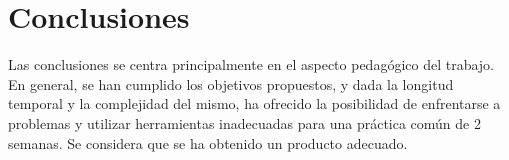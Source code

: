 \documentclass[12pt,letterpaper]{article}
\begin{document}
\section{Conclusiones}
\label{sec:conclusiones}

Las conclusiones se centra principalmente en el aspecto pedagógico
del trabajo.\\ En general, se han cumplido los objetivos propuestos, y
dada la longitud temporal y la complejidad del mismo, ha ofrecido la
posibilidad de enfrentarse a problemas y utilizar herramientas
inadecuadas para una práctica común de 2 semanas. Se considera que se
ha obtenido un producto adecuado.
\end{document}
